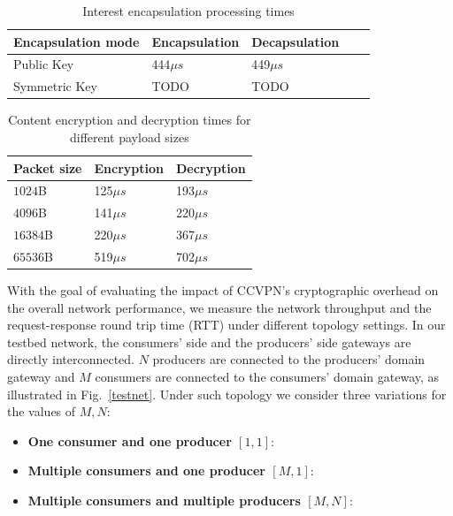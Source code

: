 \begin{table}[!h]
\centering
\caption{Interest encapsulation processing times}
\label{should_be_figure}
\begin{tabular}{|l|l|l|l|l|}
\hline
Encapsulation mode   & Encapsulation & Decapsulation \\ \hline
Public Key  & 444$\mu s$           & 449$\mu s$           \\ \hline \cline{4-5} 
Symmetric Key & TODO          & TODO          \\ \hline
\end{tabular}
\end{table}

\begin{table}[!h]
\centering
\caption{Content encryption and decryption times for different payload sizes}
\label{my-label}
\begin{tabular}{|l|l|l|}
\hline
Packet size        & Encryption & Decryption \\ \hline
$1024$B & 125$\mu s$        & 193$\mu s$        \\ \hline
$4096$B & 141$\mu s$        & 220$\mu s$        \\ \hline
$16384$B & 220$\mu s$        & 367$\mu s$        \\ \hline
$65536$B & 519$\mu s$        & 702$\mu s$        \\ \hline
\end{tabular}
\end{table}

With the goal of evaluating the impact of CCVPN's cryptographic overhead on the overall network performance, we measure the network throughput and the request-response round trip time (RTT) under different topology settings.
In our testbed network, the consumers' side and the producers' side gateways are directly interconnected. $N$ producers are connected to the producers' domain gateway and $M$ consumers are connected to the consumers' domain gateway, as illustrated in Fig.~\ref{testnet}.
Under such topology we consider three variations for the values of ${M,N}$:

\begin{itemize}
 \item \textbf{One consumer and one producer $[1,1]$}:
 \item \textbf{Multiple consumers and one producer $[M,1]$}:
 \item \textbf{Multiple consumers and multiple producers $[M,N]$}:
\end{itemize}




